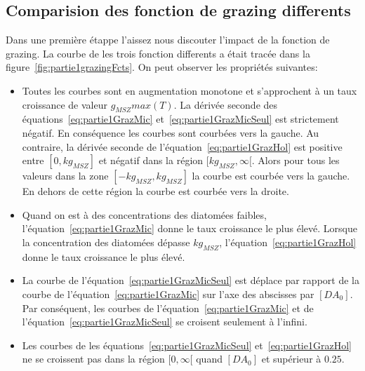 {\subsection{Comparision des fonction de grazing differents}

\par{
Dans une première étappe l'aissez nous discouter l'impact de la fonction de grazing. La courbe de les
trois fonction differents a était tracée dans la figure~\ref{fig:partie1grazingFcts}.
On peut observer les propriétés suivantes:
}
\begin{itemize}
  \item Toutes les courbes sont en augmentation monotone et s'approchent à un taux croissance de valeur
$g_{MSZ} max(T)$. La dérivée seconde des équations~\ref{eq:partie1GrazMic} et~\ref{eq:partie1GrazMicSeul}
est strictement négatif. En conséquence les courbes sont courbées vers la gauche. Au contraire, la
dérivée seconde de l'équation~\ref{eq:partie1GrazHol} est positive entre $[0, kg_{MSZ}]$
et négatif dans la région $[kg_{MSZ}, \infty[$. Alors pour tous les valeurs dans la zone $[-kg_{MSZ},kg_{MSZ}]$
la courbe est courbée vers la gauche. En dehors de cette région la courbe est courbée vers la droite.
  \item Quand on est à des concentrations des diatomées faibles, l'équation~\ref{eq:partie1GrazMic}
donne le taux croissance le plus élevé. Lorsque la concentration des diatomées dépasse $kg_{MSZ}$,
l'équation~\ref{eq:partie1GrazHol} donne le taux croissance le plus élevé.
  \item La courbe de l'équation~\ref{eq:partie1GrazMicSeul} est déplace par rapport de la
courbe de l'équation~\ref{eq:partie1GrazMic} sur l'axe des abscisses par $[DA_0]$. Par conséquent,
les courbes de l'équation~\ref{eq:partie1GrazMic} et de l'équation~\ref{eq:partie1GrazMicSeul}
se croisent seulement à l'infini.
  \item Les courbes de les équations~\ref{eq:partie1GrazMicSeul} et~\ref{eq:partie1GrazHol}
ne se croissent pas dans la région $[0, \infty[$ quand $[DA_0]$ et supérieur à $0.25$.
\end{itemize}

}
